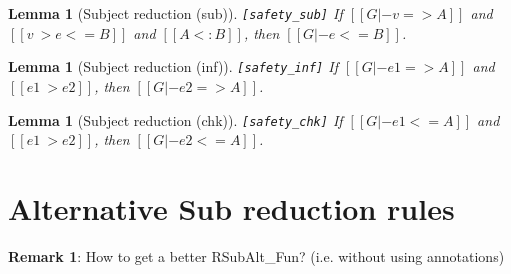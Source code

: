 \documentclass[oneside,a4paper]{article}
\newtheorem{lemma}[theorem]{Lemma}
\numberwithin{equation}{section}
\begin{document}
\begin{lemma}[Subject reduction (sub)]\verb|[safety_sub]|
  If $[[G |- v => A]]$ 
  and $[[v ~> e <= B]]$
  and $[[A <: B]]$, then 
  $[[G |- e <= B]]$.
\end{lemma}

\begin{lemma}[Subject reduction (inf)]\verb|[safety_inf]|
  If $[[G |- e1 => A]]$ 
  and $[[e1 ~> e2]]$, then 
  $[[G |- e2 => A]]$.
\end{lemma}

\begin{lemma}[Subject reduction (chk)]\verb|[safety_chk]|
  If $[[G |- e1 <= A]]$ 
  and $[[e1 ~> e2]]$, then 
  $[[G |- e2 <= A]]$.
\end{lemma}

\section{Alternative Sub reduction rules}

\begin{spacing}{0.4}
\begin{small}
\noindent
\ottdefnreductionchkalt{}\ottinterrule
\end{small}
\end{spacing}

\noindent\textbf{Remark 1}:
How to get a better RSubAlt\_Fun? (i.e. without using annotations)


%
%
%
\end{document}
